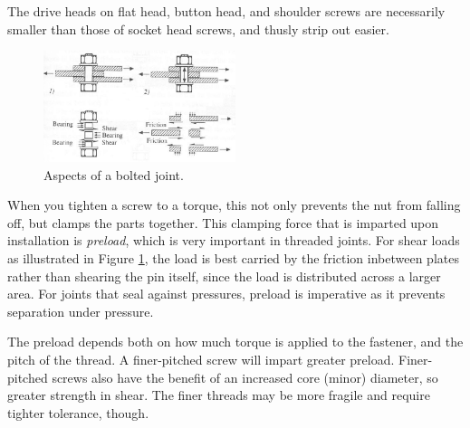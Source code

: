 	The drive heads on flat head, button head, and shoulder screws are necessarily smaller than those of socket head screws, and thusly strip out easier.
	
	\begin{figure}[H]
		\includegraphics[width=0.5\textwidth]{imgs/bolt_preload.png}
		\caption{Aspects of a bolted joint.}
		 \label{fig:bolted_joint} 
	\end{figure}
	
	When you tighten a screw to a torque, this not only prevents the nut from falling off, but clamps the parts together. This clamping force that is imparted upon installation is \textit{preload}, which is very important in threaded joints. For shear loads as illustrated in Figure \ref{fig:bolted_joint}, the load is best carried by the friction inbetween plates rather than shearing the pin itself, since the load is distributed across a larger area. For joints that seal against pressures, preload is imperative as it prevents separation under pressure.
	
	The preload depends both on how much torque is applied to the fastener, and the pitch of the thread. A finer-pitched screw will impart greater preload. Finer-pitched screws also have the benefit of an increased core (minor) diameter, so greater strength in shear. The finer threads may be more fragile and require tighter tolerance, though.
	
